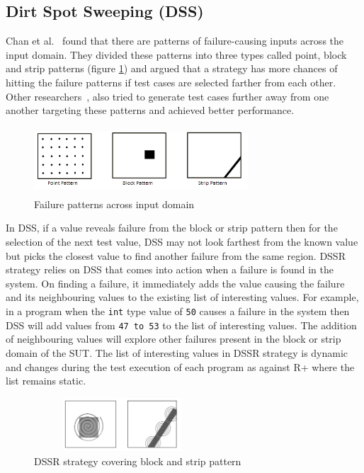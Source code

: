 \documentclass[conference]{IEEEtran}
\begin{document}
\subsection{Dirt Spot Sweeping (DSS)}
\noindent Chan et al.~\cite{Chan1996} found that there are patterns of failure-causing inputs across the input domain. They divided these patterns into three types called point, block and strip patterns (figure \ref{fig:patterns}) and argued that a strategy has more chances of hitting the failure patterns if test cases are selected farther from each other. Other researchers~\cite{Chan2002, Chen2003, Chen2005}, also tried to generate test cases further away from one another targeting these patterns and achieved better performance. %
\begin{figure}[ht]                                    
\centering
\includegraphics[width= 8cm,height=2.5cm]{ART_Patterns.png}
\caption{Failure patterns across input domain~\cite{Chen2008}}
\label{fig:patterns}
\end{figure}
\noindent In DSS, if a value reveals failure from the block or strip pattern then for the selection of the next test value, DSS may not look farthest from the known value but picks the closest value to find another failure from the same region. DSSR strategy relies on DSS that comes into action when a failure is found in the system. On finding a failure, it immediately adds the value causing the failure and its neighbouring values to the existing list of interesting values. For example, in a program when the \verb+int+ type value of \verb+50+ causes a failure in the system then DSS will add values from \verb+47 to 53+ to the list of interesting values. The addition of neighbouring values will explore other failures present in the block or strip domain of the SUT. The list of interesting values in DSSR strategy is dynamic and changes during the test execution of each program as against R+ where the list remains static.

\begin{figure}[ht]
\centering
\includegraphics[width=6.6cm,height=2cm]{block2.png}
\caption{DSSR strategy covering block and strip pattern}
\label{fig:block2}
\end{figure}
\end{document}
